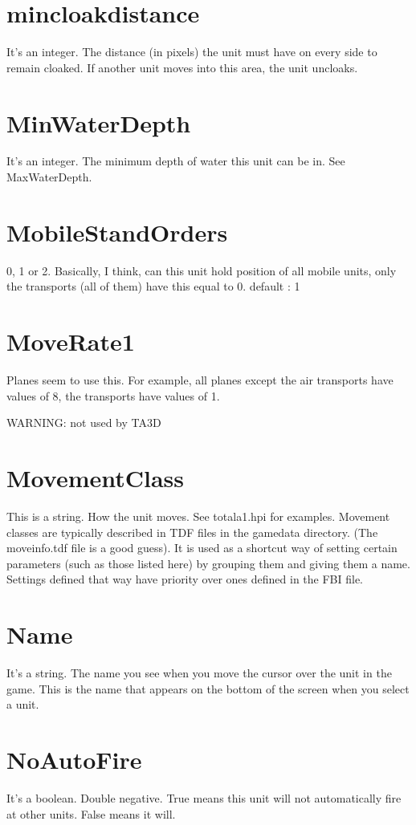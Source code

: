 \documentclass[a4paper,10pt]{article}
\begin{document}
\section{mincloakdistance}
It's an integer. The distance (in pixels) the unit must have on every side to remain cloaked. If another unit moves into this area, the unit uncloaks.

\section{MinWaterDepth}
It's an integer. The minimum depth of water this unit can be in. See MaxWaterDepth.

\section{MobileStandOrders}
0, 1 or 2. Basically, I think, can this unit hold position of all mobile units, only the transports (all of them) have this equal to 0. default : 1

\section{MoveRate1}
Planes seem to use this. For example, all planes except the air transports have values of 8, the transports have values of 1.

WARNING: not used by TA3D

\section{MovementClass}
This is a string. How the unit moves. See totala1.hpi for examples. Movement classes are typically described in TDF files in the gamedata directory. (The moveinfo.tdf file is a good guess). It is used as a shortcut way of setting certain parameters (such as those listed here) by grouping them and giving them a name. Settings defined that way have priority over ones defined in the FBI file.

\section{Name}
It's a string. The name you see when you move the cursor over the unit in the game. This is the name that appears on the bottom of the screen when you select a unit.

\section{NoAutoFire}
It's a boolean. Double negative. True means this unit will not automatically fire at other units. False means it will.
\end{document}
